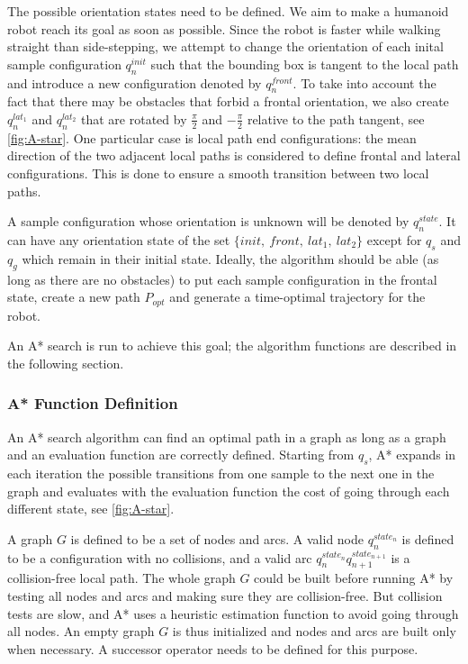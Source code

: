 The possible orientation states need to be defined. We aim to make a
humanoid robot reach its goal as soon as possible. Since the robot is
faster while walking straight than side-stepping, we attempt to change
the orientation of each inital sample configuration $q_n^{init}$ such
that the bounding box is tangent to the local path and introduce a new
configuration denoted by $q_n^{front}$. To take into account the fact
that there may be obstacles that forbid a frontal orientation, we also
create $q_n^{lat_1}$ and $q_n^{lat_2}$ that are rotated by
$\frac{\pi}{2}$ and $-\frac{\pi}{2}$ relative to the path tangent, see
\autoref{fig:A-star}. One particular case is local path end
configurations: the mean direction of the two adjacent local paths is
considered to define frontal and lateral configurations. This is done
to ensure a smooth transition between two local paths.

A sample configuration whose orientation is unknown will be denoted by
$q_n^{state}$. It can have any orientation state of the set
$\{init,~front,~lat_1,~lat_2\}$ except for $q_s$ and $q_g$ which
remain in their initial state.  Ideally, the algorithm should be able
(as long as there are no obstacles) to put each sample configuration
in the frontal state, create a new path $P_{opt}$ and generate a
time-optimal trajectory for the robot.

An A* search is run to achieve this goal; the algorithm functions are
described in the following section.

\subsubsection{A* Function Definition}
\label{sec:A-star}
\noindent An A* search algorithm can find an optimal path in a graph
as long as a graph and an evaluation function are correctly
defined. Starting from $q_s$, A* expands in each iteration the
possible transitions from one sample to the next one in the graph and
evaluates with the evaluation function the cost of going through each
different state, see \autoref{fig:A-star}.

A graph $G$ is defined to be a set of nodes and arcs. A valid node
$q_n^{state_n}$ is defined to be a configuration with no collisions, and a valid arc
$q_n^{state_n}q_{n+1}^{state_{n+1}}$ is a collision-free local
path. The whole graph $G$ could be built before running A* by testing
all nodes and arcs and making sure they are collision-free. But
collision tests are slow, and A* uses a heuristic estimation function
to avoid going through all nodes. An empty graph $G$ is thus
initialized and nodes and arcs are built only when necessary. A
successor operator needs to be defined for this purpose.

